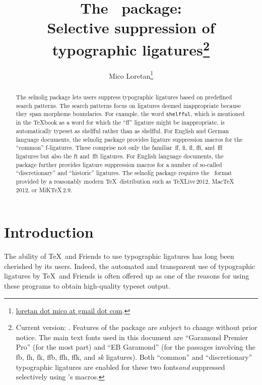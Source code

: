 \documentclass[12pt]{article}
\title{The \selnoligpackagename\ package: \\
Selective suppression of typographic ligatures\thanks{
Current version: \selnoligpackageversion. Features of the \pkg{selnolig} package are subject to change without prior notice. 
\newline\hspace*{\parindent}
The main text fonts used in this document are \enquote{Garamond Premier Pro} (for the most part) and \enquote{EB Garamond} (for the passages involving the \bgroup\ebg \mbox{fb}, \mbox{fh}, \mbox{fk}, \mbox{ffb}, \mbox{ffh},  \mbox{ffk}, and \emph{\mbox{sk}} ligatures\egroup). Both \enquote{common} and \enquote{discretionary} typographic ligatures are enabled for these two fonts\textemdash \emph{and} suppressed selectively using \pkg{selnolig}'s macros.}}
\author{Mico Loretan\thanks{
\href{mailto:loretan.mico@gmail.com}{loretan dot mico at gmail dot com}.}}
\date{\selnoligpackagedate}
\newcommand{\pkg}[1]{\textsf{#1}}
\newcommand{\opt}[1]{\texttt{#1}}
\begin{document}

\VerbatimFootnotes
{}

\maketitle


\begin{abstract}

The \pkg{selnolig} package lets users suppress typographic ligatures based on pre\-defined search patterns. The search patterns focus on ligatures deemed inappropriate because they span morpheme boundaries. For example, the word \opt{shelfful}, which is mentioned in the \TeX book as a word for which the \enquote{ff} ligature might be inappropriate, is automatically typeset as shelfful rather than as shel\mbox{ff}ul.
\newline\hspace*{\parindent}
For English and German language documents, the \pkg{selnolig} package provides ligature suppression macros  for the \enquote{common} f-ligatures. These comprise not only the familiar~ff, fi, fl, ffi, and~ffl ligatures but also the ft and~fft ligatures.
\newline\hspace*{\parindent}
For English language documents, the package further provides ligature suppression macros for a number of so-called \enquote{discretionary} and \enquote{historic} ligatures.
\newline\hspace*{\parindent}
The \pkg{selnolig} package requires the \LuaLaTeX\ format provided by a reasonably modern \TeX\ distribution such as \TeX Live\,2012, Mac\TeX\,2012, or MiK\TeX\,2.9.
\end{abstract}


\enlargethispage{0.8\baselineskip}
\tableofcontents

\clearpage
{}
\section{Introduction}

The ability of \TeX\ and Friends to use typographic ligatures has long been cherished by its users. Indeed, the automated and transparent use of typographic ligatures by \TeX\ and Friends is often offered up as one of the reasons for using these programs to obtain high-quality typeset output.
\end{document}
